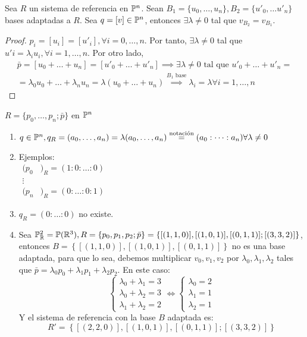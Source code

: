 \begin{prop}
    Sea $R$ un sistema de referencia en $\mathbb{P}^n$. Sean $B_1 = \{ u_0, \dots, u_n\}, B_2 = \{ u'_0, \dots u'_n \}$ bases adaptadas a $R$. Sea $q = [v] \in \mathbb{P}^n$, entonces $\exists \lambda \neq 0$ tal que $v_{B_2} = v_{B_1}$.
\end{prop}
\begin{proof}
    $p_i = [u_i] = [u'_i], \forall i = 0, \dots, n$. Por tanto, $\exists \lambda \neq 0$ tal que $u'i= \lambda_i u_i, \forall i = 1, \dots, n$. Por otro lado,
    \begin{gather*}
        \bar{p} = [u_0 + \dots + u_n] = [u'_0 + \dots + u'_n] \implies \exists \lambda \neq 0 \text{ tal que } u'_0 + \dots + u'_n = \\ = \lambda_0 u_0 + \dots + \lambda_n u_n = \lambda (u_0 + \dots + u_n)
        \stackrel{B_1 \text{ base}}{\implies} \lambda_i = \lambda \forall i = 1, \dots, n
    \end{gather*}
\end{proof}
\begin{obs}
    $R = \{ p_0, \dots, p_n; \bar{p} \}$ en $\mathbb{P}^n$
    \begin{enumerate}
        \item $q \in \mathbb{P}^n, q_R = (a_0, \dots, a_n) = \lambda (a_0, \dots, a_n) \stackrel{\text{notación}}{=} (a_0 : \dots : a_n) \forall \lambda \neq 0$
        \item Ejemplos: \\ $\begin{aligned} (p_0&)_R = (1:0:\dots:0) \\ \vdots& \\ (p_n&)_R = (0:\dots:0:1) \end{aligned}$
        \item $q_R = (0: \dots : 0)$ no existe.
        \item Sea $\mathbb{P}^2_{\mathbb{R}} = \mathbb{P}(\mathbb{R}^3), R = \{ p_0, p_1, p_2; \bar{p} \} = \left\{ [(1,1,0)], [(1,0,1)], [(0,1,1)]; [(3,3,2)]\right\}$, entonces $B = \left\{ [(1,1,0)], [(1,0,1)], [(0,1,1)] \right\}$ no es una base
            adaptada, para que lo sea, debemos multiplicar $v_0, v_1, v_2$ por $\lambda_0, \lambda_1, \lambda_2$ tales que $\bar{p} = \lambda_0 p_0 + \lambda_1 p_1 + \lambda_2 p_2$. En este caso:
            \[
                \begin{cases} \lambda_0 + \lambda_1 = 3 \\ \lambda_0 + \lambda_2 = 3 \\ \lambda_1 + \lambda_2 = 2 \end{cases} \iff \begin{cases} \lambda_0 = 2 \\ \lambda_1 = 1 \\ \lambda_2 = 1 \end{cases}
            \]
            Y el sistema de referencia con la base $B$ adaptada es: \[ R' = \left\{ [(2,2,0)], [(1,0,1)], [(0,1,1)]; [(3,3,2)]\right\} \]
    \end{enumerate}
\end{obs}

